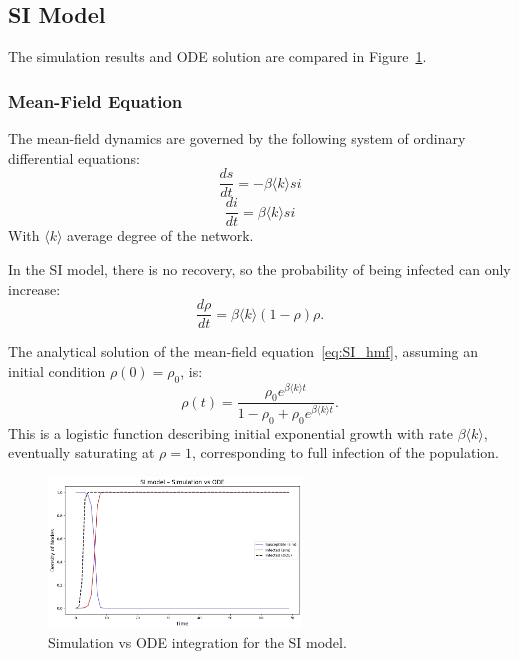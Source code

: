 \subsection{SI Model}
The simulation results and ODE solution are compared in Figure~\ref{fig:si_compare}.

\subsubsection{Mean-Field Equation}

The mean-field dynamics are governed by the following system of ordinary differential equations:
$$\dfrac{ds}{dt}=-\beta \langle k \rangle si$$ $$\dfrac{di}{dt}=\beta \langle k \rangle si$$
With $\langle k \rangle$ average degree of the network.

In the SI model, there is no recovery, so the probability of being infected can only increase:
\begin{equation}
\frac{d\rho}{dt} = \beta \langle k \rangle (1 - \rho) \rho.
\label{eq:SI_hmf}
\end{equation}

The analytical solution of the mean-field equation~\eqref{eq:SI_hmf}, assuming an initial condition $\rho(0) = \rho_0$, is:
\begin{equation}
\rho(t) = \frac{\rho_0 e^{\beta \langle k \rangle t}}{1 - \rho_0 + \rho_0 e^{\beta \langle k \rangle t}}.
\label{eq:SI_analytical}
\end{equation}
This is a logistic function describing initial exponential growth with rate $\beta \langle k \rangle$, eventually saturating at $\rho = 1$, corresponding to full infection of the population.




\begin{figure}[H]
\centering
\includegraphics[width=0.6\textwidth]{images/Homogeneous/SI_densities.png}
\caption{Simulation vs ODE integration for the SI model.}
\label{fig:si_compare}
\end{figure}



